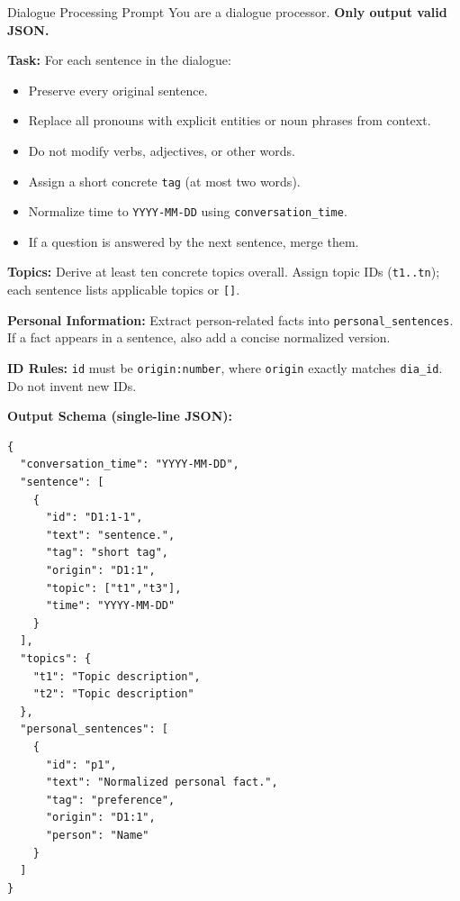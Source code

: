 \documentclass{llmxive}
\begin{document}
\begin{promptbox}{Dialogue Processing Prompt}
You are a dialogue processor. \textbf{Only output valid JSON.}

\textbf{Task:}
For each sentence in the dialogue:
\begin{itemize}[leftmargin=1.25em,itemsep=2pt,topsep=2pt]
  \item Preserve every original sentence.
  \item Replace all pronouns with explicit entities or noun phrases from context.
  \item Do not modify verbs, adjectives, or other words.
  \item Assign a short concrete \texttt{tag} (at most two words).
  \item Normalize time to \texttt{YYYY-MM-DD} using \texttt{conversation\_time}.
  \item If a question is answered by the next sentence, merge them.
\end{itemize}

\textbf{Topics:}
Derive at least ten concrete topics overall.  
Assign topic IDs (\texttt{t1..tn}); each sentence lists applicable topics or \texttt{[]}.

\textbf{Personal Information:}
Extract person-related facts into \texttt{personal\_sentences}.  
If a fact appears in a sentence, also add a concise normalized version.

\textbf{ID Rules:}
\texttt{id} must be \texttt{origin:number}, where \texttt{origin} exactly matches \texttt{dia\_id}.  
Do not invent new IDs.

\textbf{Output Schema (single-line JSON):}
\begin{lstlisting}[style=json]
{
  "conversation_time": "YYYY-MM-DD",
  "sentence": [
    {
      "id": "D1:1-1",
      "text": "sentence.",
      "tag": "short tag",
      "origin": "D1:1",
      "topic": ["t1","t3"],
      "time": "YYYY-MM-DD"
    }
  ],
  "topics": {
    "t1": "Topic description",
    "t2": "Topic description"
  },
  "personal_sentences": [
    {
      "id": "p1",
      "text": "Normalized personal fact.",
      "tag": "preference",
      "origin": "D1:1",
      "person": "Name"
    }
  ]
}
\end{lstlisting}
\end{promptbox}


\end{document}
